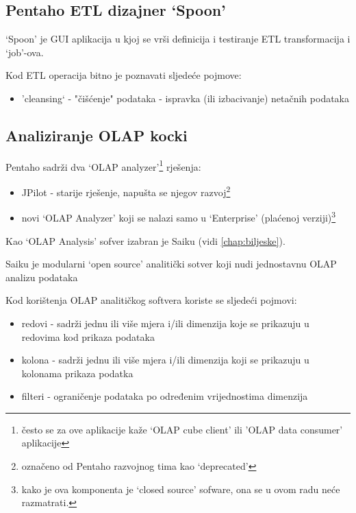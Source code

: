 \documentclass[times, utf8, seminar]{fit}
\begin{document}
\subsection{Pentaho ETL dizajner `Spoon'}

`Spoon' je GUI aplikacija u kjoj se vrši definicija i testiranje ETL transformacija i `job'-ova.

Kod ETL operacija bitno je poznavati sljedeće pojmove:

\begin{itemize}
  \item 'cleansing` - "čišćenje" podataka - ispravka (ili izbacivanje) netačnih podataka
\end{itemize}

\subsection{Analiziranje OLAP kocki}

Pentaho sadrži dva `OLAP analyzer'\footnote{često se za ove aplikacije kaže `OLAP cube client' ili 'OLAP data consumer' aplikacije} rješenja:

\begin{itemize}
  \item JPilot - starije rješenje, napušta se njegov razvoj\footnote{označeno od Pentaho razvojnog tima kao `deprecated'}
  \item novi `OLAP Analyzer' koji se nalazi samo u `Enterprise' (plaćenoj verziji)\footnote{kako je ova komponenta je `closed source' sofware, ona se u ovom radu neće razmatrati.}
\end{itemize}

Kao `OLAP Analysis' sofver izabran je Saiku (vidi \ref{chap:biljeske}).

Saiku je modularni `open source' analitički sotver koji nudi jednostavnu OLAP analizu podataka \cite{web:saiku}

Kod korištenja OLAP analitičkog softvera koriste se sljedeći pojmovi:

\begin{itemize}
  \item redovi - sadrži jednu ili više mjera i/ili dimenzija koje se prikazuju u redovima kod prikaza podataka
  \item kolona - sadrži jednu ili više mjera i/ili dimenzija koji se prikazuju u kolonama prikaza podatka
  \item filteri - ograničenje podataka po određenim vrijednostima dimenzija
\end{itemize}
\end{document}
